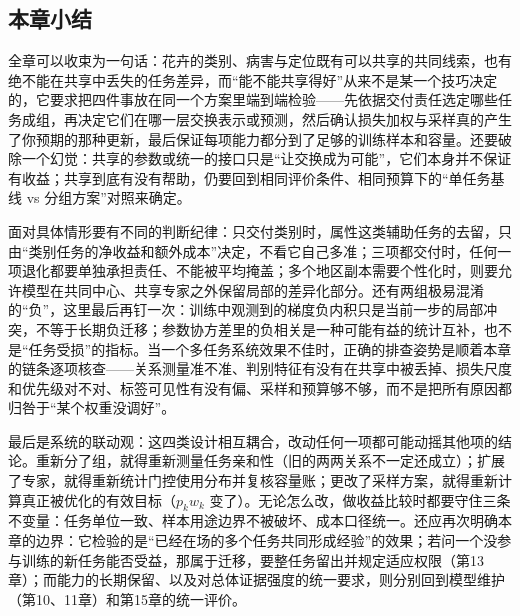 \begin{samepage}
\section{本章小结}
\label{sec:ket-sharing-summary}

全章可以收束为一句话：花卉的类别、病害与定位既有可以共享的共同线索，也有绝不能在共享中丢失的任务差异，而“能不能共享得好”从来不是某一个技巧决定的，它要求把四件事放在同一个方案里端到端检验——先依据交付责任选定哪些任务成组，再决定它们在哪一层交换表示或预测，然后确认损失加权与采样真的产生了你预期的那种更新，最后保证每项能力都分到了足够的训练样本和容量。还要破除一个幻觉：共享的参数或统一的接口只是“让交换成为可能”，它们本身并不保证有收益；共享到底有没有帮助，仍要回到相同评价条件、相同预算下的“单任务基线 vs 分组方案”对照来确定。

\end{samepage}

面对具体情形要有不同的判断纪律：只交付类别时，属性这类辅助任务的去留，只由“类别任务的净收益和额外成本”决定，不看它自己多准；三项都交付时，任何一项退化都要单独承担责任、不能被平均掩盖；多个地区副本需要个性化时，则要允许模型在共同中心、共享专家之外保留局部的差异化部分。还有两组极易混淆的“负”，这里最后再钉一次：训练中观测到的梯度负内积只是当前一步的局部冲突，不等于长期负迁移；参数协方差里的负相关是一种可能有益的统计互补，也不是“任务受损”的指标。当一个多任务系统效果不佳时，正确的排查姿势是顺着本章的链条逐项核查——关系测量准不准、判别特征有没有在共享中被丢掉、损失尺度和优先级对不对、标签可见性有没有偏、采样和预算够不够，而不是把所有原因都归咎于“某个权重没调好”。

最后是系统的联动观：这四类设计相互耦合，改动任何一项都可能动摇其他项的结论。重新分了组，就得重新测量任务亲和性（旧的两两关系不一定还成立）；扩展了专家，就得重新统计门控使用分布并复核容量账；更改了采样方案，就得重新计算真正被优化的有效目标（$p_kw_k$ 变了）。无论怎么改，做收益比较时都要守住三条不变量：任务单位一致、样本用途边界不被破坏、成本口径统一。还应再次明确本章的边界：它检验的是“已经在场的多个任务共同形成经验”的效果；若问一个没参与训练的新任务能否受益，那属于迁移，要整任务留出并规定适应权限（第13章）；而能力的长期保留、以及对总体证据强度的统一要求，则分别回到模型维护（第10、11章）和第15章的统一评价。
